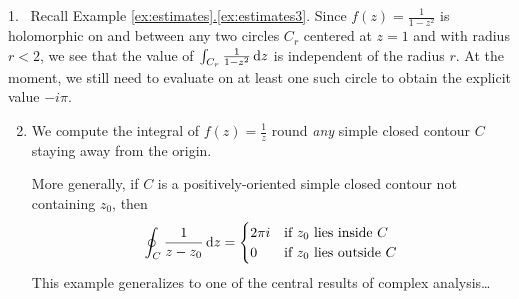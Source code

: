 \begin{examples}{}{}
\hangindent\leftmargini
\textup{1.} \ Recall Example \hyperref[ex:estimates3]{\ref*{ex:estimates}.\ref*{ex:estimates3}}. Since $f(z)=\frac 1{1-z^2}$ is holomorphic on and between any two circles $C_{r}$ centered at $z=1$ and with radius $r<2$, we see that the value of $\int_{C_r}\frac 1{1-z^2}\,{\mathrm{d} z}$ is independent of the radius $r$. At the moment, we still need to evaluate on at least one such circle to obtain the explicit value $-i\pi$.

\begin{enumerate}\setcounter{enumi}{1}
  \item We compute the integral of $f(z)=\frac 1z$ round \emph{any} simple closed contour $C$ staying away from the origin.

  More generally, if $C$ is a positively-oriented simple closed contour not containing $z_0$, then
  \[\oint_C\frac 1{z-z_0}\,{\mathrm{d} z}=\begin{cases}
  2\pi i&\text{if $z_0$ lies inside $C$}\\
  0&\text{if $z_0$ lies outside $C$}
  \end{cases}\]
  This example generalizes to one of the central results of complex analysis\ldots
\end{enumerate}
\end{examples}



